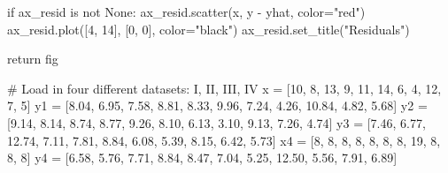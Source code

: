 \documentclass[
  letterpaper,
  DIV=11,
  numbers=noendperiod]{scrreprt}
\newenvironment{Shaded}{\begin{snugshade}}{\end{snugshade}}
\newcommand{\CommentTok}[1]{\textcolor[rgb]{0.37,0.37,0.37}{#1}}
\newcommand{\ControlFlowTok}[1]{\textcolor[rgb]{0.00,0.23,0.31}{#1}}
\newcommand{\DecValTok}[1]{\textcolor[rgb]{0.68,0.00,0.00}{#1}}
\newcommand{\FloatTok}[1]{\textcolor[rgb]{0.68,0.00,0.00}{#1}}
\newcommand{\KeywordTok}[1]{\textcolor[rgb]{0.00,0.23,0.31}{#1}}
\newcommand{\NormalTok}[1]{\textcolor[rgb]{0.00,0.23,0.31}{#1}}
\newcommand{\OperatorTok}[1]{\textcolor[rgb]{0.37,0.37,0.37}{#1}}
\newcommand{\StringTok}[1]{\textcolor[rgb]{0.13,0.47,0.30}{#1}}
\newcommand{\VariableTok}[1]{\textcolor[rgb]{0.07,0.07,0.07}{#1}}
\begin{document}
\begin{Shaded}
\begin{Highlighting}[]
    \ControlFlowTok{if}\NormalTok{ ax\_resid }\KeywordTok{is} \KeywordTok{not} \VariableTok{None}\NormalTok{:}
\NormalTok{        ax\_resid.scatter(x, y }\OperatorTok{{-}}\NormalTok{ yhat, color}\OperatorTok{=}\StringTok{"red"}\NormalTok{)}
\NormalTok{        ax\_resid.plot([}\DecValTok{4}\NormalTok{, }\DecValTok{14}\NormalTok{], [}\DecValTok{0}\NormalTok{, }\DecValTok{0}\NormalTok{], color}\OperatorTok{=}\StringTok{"black"}\NormalTok{)}
\NormalTok{        ax\_resid.set\_title(}\StringTok{"Residuals"}\NormalTok{)}

    \ControlFlowTok{return}\NormalTok{ fig}
\end{Highlighting}
\end{Shaded}

\begin{Shaded}
\begin{Highlighting}[]
\CommentTok{\# Load in four different datasets: I, II, III, IV}
\NormalTok{x }\OperatorTok{=}\NormalTok{ [}\DecValTok{10}\NormalTok{, }\DecValTok{8}\NormalTok{, }\DecValTok{13}\NormalTok{, }\DecValTok{9}\NormalTok{, }\DecValTok{11}\NormalTok{, }\DecValTok{14}\NormalTok{, }\DecValTok{6}\NormalTok{, }\DecValTok{4}\NormalTok{, }\DecValTok{12}\NormalTok{, }\DecValTok{7}\NormalTok{, }\DecValTok{5}\NormalTok{]}
\NormalTok{y1 }\OperatorTok{=}\NormalTok{ [}\FloatTok{8.04}\NormalTok{, }\FloatTok{6.95}\NormalTok{, }\FloatTok{7.58}\NormalTok{, }\FloatTok{8.81}\NormalTok{, }\FloatTok{8.33}\NormalTok{, }\FloatTok{9.96}\NormalTok{, }\FloatTok{7.24}\NormalTok{, }\FloatTok{4.26}\NormalTok{, }\FloatTok{10.84}\NormalTok{, }\FloatTok{4.82}\NormalTok{, }\FloatTok{5.68}\NormalTok{]}
\NormalTok{y2 }\OperatorTok{=}\NormalTok{ [}\FloatTok{9.14}\NormalTok{, }\FloatTok{8.14}\NormalTok{, }\FloatTok{8.74}\NormalTok{, }\FloatTok{8.77}\NormalTok{, }\FloatTok{9.26}\NormalTok{, }\FloatTok{8.10}\NormalTok{, }\FloatTok{6.13}\NormalTok{, }\FloatTok{3.10}\NormalTok{, }\FloatTok{9.13}\NormalTok{, }\FloatTok{7.26}\NormalTok{, }\FloatTok{4.74}\NormalTok{]}
\NormalTok{y3 }\OperatorTok{=}\NormalTok{ [}\FloatTok{7.46}\NormalTok{, }\FloatTok{6.77}\NormalTok{, }\FloatTok{12.74}\NormalTok{, }\FloatTok{7.11}\NormalTok{, }\FloatTok{7.81}\NormalTok{, }\FloatTok{8.84}\NormalTok{, }\FloatTok{6.08}\NormalTok{, }\FloatTok{5.39}\NormalTok{, }\FloatTok{8.15}\NormalTok{, }\FloatTok{6.42}\NormalTok{, }\FloatTok{5.73}\NormalTok{]}
\NormalTok{x4 }\OperatorTok{=}\NormalTok{ [}\DecValTok{8}\NormalTok{, }\DecValTok{8}\NormalTok{, }\DecValTok{8}\NormalTok{, }\DecValTok{8}\NormalTok{, }\DecValTok{8}\NormalTok{, }\DecValTok{8}\NormalTok{, }\DecValTok{8}\NormalTok{, }\DecValTok{19}\NormalTok{, }\DecValTok{8}\NormalTok{, }\DecValTok{8}\NormalTok{, }\DecValTok{8}\NormalTok{]}
\NormalTok{y4 }\OperatorTok{=}\NormalTok{ [}\FloatTok{6.58}\NormalTok{, }\FloatTok{5.76}\NormalTok{, }\FloatTok{7.71}\NormalTok{, }\FloatTok{8.84}\NormalTok{, }\FloatTok{8.47}\NormalTok{, }\FloatTok{7.04}\NormalTok{, }\FloatTok{5.25}\NormalTok{, }\FloatTok{12.50}\NormalTok{, }\FloatTok{5.56}\NormalTok{, }\FloatTok{7.91}\NormalTok{, }\FloatTok{6.89}\NormalTok{]}


\end{Highlighting}
\end{Shaded}
\end{document}
